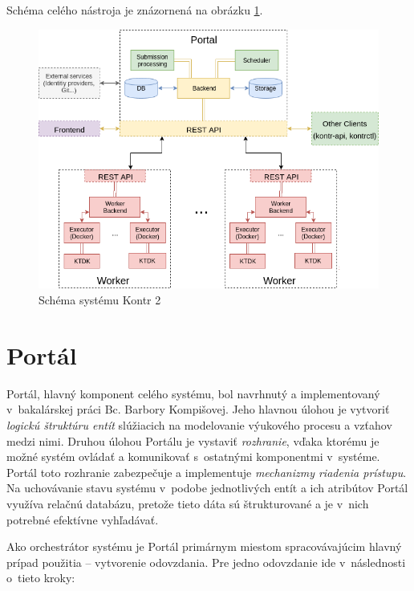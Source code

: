 \documentclass[
  digital, %
  oneside, %
  table,   %
  lof,     %
  lot,   %
]{fithesis3}
\begin{document}
Schéma celého nástroja je znázornená na obrázku \ref{fig:kontr2}.
\clearpage
\begin{figure}[!ht]
  \begin{center}
    \includegraphics[width=\textwidth]{imgs/system-full.png}
  \end{center}
    \caption{Schéma systému Kontr 2}
    \label{fig:kontr2}
\end{figure}

\section{Portál}

Portál, hlavný komponent celého systému, bol navrhnutý a implementovaný v~bakalárskej práci Bc. Barbory Kompišovej\cite{kontr-portal}. Jeho hlavnou úlohou je vytvoriť \emph{logickú štruktúru entít} slúžiacich na modelovanie výukového procesu a vzťahov medzi nimi. Druhou úlohou Portálu je vystaviť \emph{rozhranie}, vďaka ktorému je možné systém ovládať a komunikovať s~ostatnými komponentmi v~systéme. Portál toto rozhranie zabezpečuje a implementuje \emph{mechanizmy riadenia prístupu}\cite{RFC4949}. Na uchovávanie stavu systému v~podobe jednotlivých entít a ich atribútov Portál využíva relačnú databázu, pretože tieto dáta sú štrukturované a je v~nich potrebné efektívne vyhľadávať.

Ako orchestrátor systému je Portál primárnym miestom spracovávajúcim hlavný prípad použitia -- vytvorenie odovzdania. Pre jedno odovzdanie ide v~následnosti o~tieto kroky: 
\end{document}
